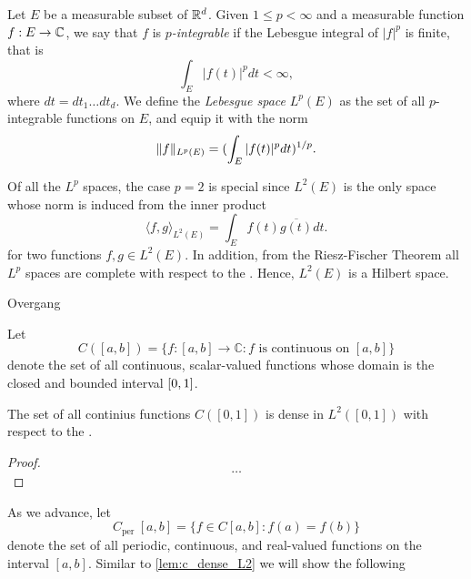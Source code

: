\documentclass[../thesis.tex]{subfiles}
\begin{document}
\begin{definition}
    Let $E$ be a measurable subset of $\mathbb{R}^d$. Given $1 \leq p < \infty$ and a measurable function $f:E\rightarrow \mathbb{C}$, we say that $f$ is \emph{$p$-integrable} if the Lebesgue integral of $|f|^p$ is finite, that is
    \begin{equation*}
        \int_{E} |f(t)|^p dt < \infty,
    \end{equation*}
    where $dt= dt_1 \dots dt_d$. We define the \emph{Lebesgue space} $L^p(E)$ as the set of all $p$-integrable functions on $E$, and equip it with the norm
    \begin{equation*}
        \|f\|_{L^p(E)} = (\int_{E} |f(t)|^p dt)^{1/p}.
    \end{equation*}
\end{definition}

Of all the $L^p$ spaces, the case $p=2$ is special since $L^2(E)$ is the only space whose norm is induced from the inner product
\begin{equation}
    \langle f, g\rangle_{L^2(E)} = \int_{E} f(t)\overline{g(t)} dt.
\end{equation}
for two functions $f,g\in L^2(E)$. In addition, from the Riesz-Fischer Theorem \cite[p.~279]{heilIntroductionRealAnalysis2019} all $L^p$ spaces are complete with respect to the \LPnorm. Hence, $L^2(E)$ is a Hilbert space. 


\colorbox{BurntOrange}{Overgang}


Let
\begin{equation}
    C([a,b]) = \{f:[a,b] \rightarrow \mathbb{C}: f \text{ is continuous on } [a,b]\}
\end{equation}
denote the set of all continuous, scalar-valued functions whose domain is the closed and bounded interval $[0,1]$.

\begin{lemma}\label{lem:c_dense_L2}
    The set of all continius functions $C([0,1])$ is dense in $L^2([0,1])$ with respect to the \Ltwonorm \cite[p.~326]{rudinPrinciplesMathematicalAnalysis20}.
\end{lemma}

\begin{proof}
    $$\dots$$
\end{proof}

As we advance, let
\begin{equation*}
C_{\text {per }}[a,b]=\{f \in C[a,b]: f(a)=f(b)\}
\end{equation*}
denote the set of all periodic, continuous, and real-valued functions on the interval $[a,b]$. Similar to \cref{lem:c_dense_L2} we will show the following
\end{document}
